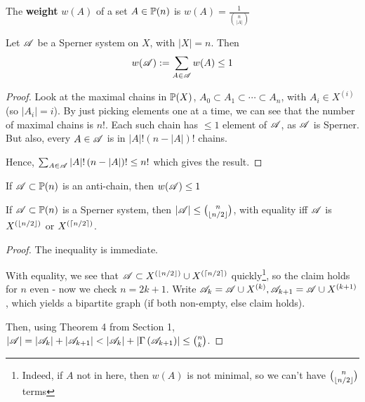 \documentclass[a4paper]{article}
\begin{document}
{\begin{defi}[Weight]
	The \textbf{weight} $w(A)$ of a set $A\in\P(n)$ is $w(A)=\frac{1}{\binom{n}{|A|}}$
\end{defi}

\begin{thm-num} 
	Let $\A$ be a Sperner system on $X$, with $|X|=n$. Then $$w(\A):=\sum_{A\in\A}w(A)\leq 1$$
\end{thm-num}
\begin{proof}
	Look at the maximal chains in $\P(X)$, $A_0\subset A_1\subset\cdots\subset A_n$, with $A_i\in X^{(i)}$ (so $|A_i|=i$). By just picking elements one at a time, we can see that the number of maximal chains is $n!$. Each such chain has $\leq 1$ element of $\A$, as $\A$ is Sperner. But also, every $A\in\A$ is in $|A|!\left(n-|A|\right)!$ chains.
	
	Hence, $\sum_{A\in\A}|A|!\left(n-|A|\right)!\leq n!$ which gives the result.
\end{proof}

\addtocounter{cor-num}{-1}
\begin{thm-num}
	If $\A\subset \P(n)$ is an anti-chain, then $w(\A)\leq 1$
\end{thm-num}

\begin{cor-num}
	If $\A\subset\P(n)$ is a Sperner system, then $|\A|\leq\binom{n}{\lf n/2\rf}$, with equality iff $\A$ is $X^{(\lf n/2\rf)}$ or $X^{(\lc n/2\rc)}$.
\end{cor-num}
\begin{proof}
	The inequality is immediate.
	
	With equality, we see that $\A\subset X^{(\lf n/2\rf)}\cup X^{(\lc n/2\rc)}$ quickly\footnote{Indeed, if $A$ not in here, then $w(A)$ is not minimal, so we can't have $\binom{n}{\lf n/2 \rf}$ terms}, so the claim holds for $n$ even - now we check $n=2k+1$. Write $\A_k=\A\cup X^{(k)}, \A_{k+1}=\A\cup X^{(k+1)}$, which yields a bipartite graph (if both non-empty, else claim holds).
	
	Then, using Theorem 4 from Section 1, $|\A|=\left|\A_k\right|+\left|\A_{k+1}\right|<\left|\A_k\right|+\left|\Gamma\left(\A_{k+1}\right)\right|\leq\binom{n}{k}$.
\end{proof}

}
\end{document}
